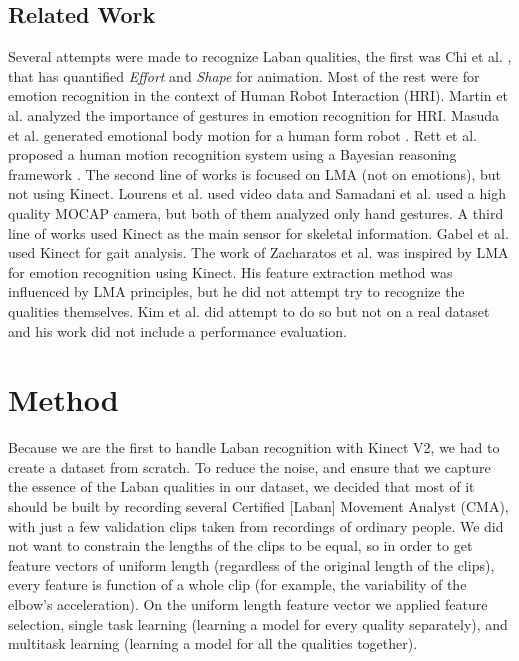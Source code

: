 \documentclass[11pt,twocolumn,varwidth=true,a4paper,fleqn]{article}
\begin{document}
\subsection{Related Work}
Several attempts were made to recognize Laban qualities, the first was Chi et al. \cite{chi2000emote}, that has quantified \textit{Effort} and \textit{Shape} for animation. Most of the rest were for emotion recognition in the context of Human Robot Interaction (HRI). Martin et al. \cite{martin} analyzed the importance of gestures in emotion recognition for HRI. Masuda et al. generated emotional body motion for a human 
form robot \cite{Masuda}. Rett et al. proposed a human motion recognition 
system using a Bayesian reasoning framework \cite{Rett}. The second line of
works is focused on LMA (not on emotions), but not using Kinect. Lourens et al. \cite{lourens2010communicating} used video data and Samadani et al.
\cite{samadani2013laban} used a high quality MOCAP camera, but both of them
analyzed only hand gestures. A third line of works used Kinect as the main
sensor for skeletal information. Gabel et al.
\cite{gabel2012full} used Kinect for gait analysis. The work of
Zacharatos et al. \cite{Zacharatos} was inspired by LMA for emotion recognition using Kinect. His feature extraction method was influenced by LMA principles, but he did not attempt try to recognize the qualities themselves. Kim et al. \cite{kim} did attempt to do so but not on a real dataset and his work did not include a performance evaluation.
\section{Method}
Because we are the first to handle Laban recognition with
Kinect V2, we had to create a dataset from scratch. To reduce the noise, and ensure that we capture the essence of the Laban qualities in our dataset, we decided that most of it should be built by recording several Certified [Laban] Movement Analyst (CMA), with just a few validation clips taken from recordings of ordinary people. We did not want to
constrain the lengths of the clips to be equal, so in order to get feature
vectors of uniform length (regardless of the original length of the clips),
every feature is function of a whole clip (for example, the variability of the
elbow's acceleration). On the uniform length feature vector we applied feature
selection, single task learning (learning a model for every quality separately),
and multitask learning (learning a model for all the qualities together).
\end{document}
